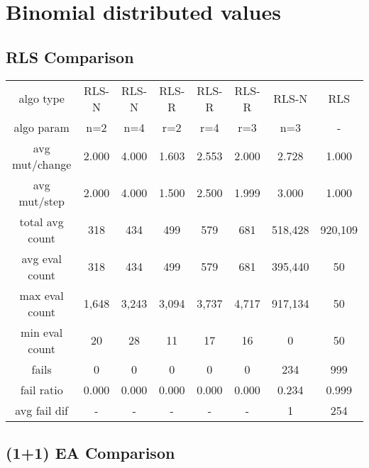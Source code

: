 \section{Binomial distributed values}

\subsection{RLS Comparison}


\begin{tabular}[h]{cccccccc}
algo type&          RLS-N&   RLS-N&   RLS-R&   RLS-R&   RLS-R&   RLS-N&     RLS\\
algo param&           n=2&     n=4&     r=2&     r=4&     r=3&     n=3&       -\\
avg mut/change&     2.000&   4.000&   1.603&   2.553&   2.000&   2.728&   1.000\\
avg mut/step&       2.000&   4.000&   1.500&   2.500&   1.999&   3.000&   1.000\\
\hline
total avg count&      318&     434&     499&     579&     681& 518,428& 920,109\\
avg eval count&       318&     434&     499&     579&     681& 395,440&      50\\
max eval count&     1,648&   3,243&   3,094&   3,737&   4,717& 917,134&      50\\
min eval count&        20&      28&      11&      17&      16&       0&      50\\
\hline
fails&                  0&       0&       0&       0&       0&     234&     999\\
fail ratio&         0.000&   0.000&   0.000&   0.000&   0.000&   0.234&   0.999\\
avg fail dif&           -&       -&       -&       -&       -&       1&     254\\
\end{tabular}


\subsection{(1+1) EA Comparison}


